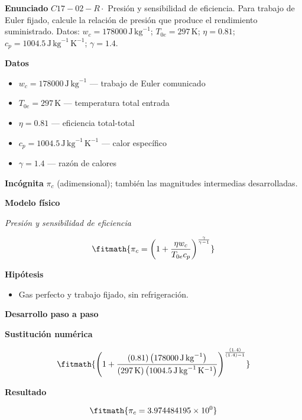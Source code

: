 \documentclass[10pt,openany]{book}
\begin{document}
\begin{tcolorbox}[title={Problema resuelto 2}, studiumworked, breakable]

\noindent\textbf{Enunciado}
\(C17-02-R \cdot\) Presión y sensibilidad de eficiencia. Para trabajo de Euler fijado, calcule la relación de presión que produce el rendimiento suministrado. Datos: \(w_c=178000\, \mathrm{J}\,\mathrm{kg}^{-1}\); \(T_{0e}=297\, \mathrm{K}\); \(\eta=0.81\); \(c_p=1004.5\, \mathrm{J}\,\mathrm{kg}^{-1}\,\mathrm{K}^{-1}\); \(\gamma=1.4\).

\noindent\textbf{Datos}
\begin{itemize}
\item $w_c = 178000\,\mathrm{J}\,\mathrm{kg}^{-1}$ — trabajo de Euler comunicado
\item $T_{0e} = 297\,\mathrm{K}$ — temperatura total entrada
\item $\eta = 0.81$ — eficiencia total-total
\item $c_p = 1004.5\,\mathrm{J}\,\mathrm{kg}^{-1}\,\mathrm{K}^{-1}$ — calor específico
\item $\gamma = 1.4$ — razón de calores
\end{itemize}

\noindent\textbf{Incógnita}
$\pi_c$ (adimensional); también las magnitudes intermedias desarrolladas.

\noindent\textbf{Modelo físico}

\noindent\textit{Presión y sensibilidad de eficiencia}

\[
\fitmath{\pi_c=\left(1 + \frac{\eta w_c}{T_{0e} c_p}\right)^{\frac{\gamma}{\gamma - 1}}}
\]

\noindent\textbf{Hipótesis}
\begin{itemize}
\item Gas perfecto y trabajo fijado, sin refrigeración.
\end{itemize}

\noindent\textbf{Desarrollo paso a paso}



\noindent\textbf{Sustitución numérica}

\[
\fitmath{\left(1 + \frac{\left(0.81\right) \left(178000\,\mathrm{J}\,\mathrm{kg}^{-1}\right)}{\left(297\,\mathrm{K}\right) \left(1004.5\,\mathrm{J}\,\mathrm{kg}^{-1}\,\mathrm{K}^{-1}\right)}\right)^{\frac{\left(1.4\right)}{\left(1.4\right) - 1}}}
\]

\noindent\textbf{Resultado}

\[
\fitmath{\pi_c=3.974484195\times10^{0}}
\]


\end{tcolorbox}
\end{document}
